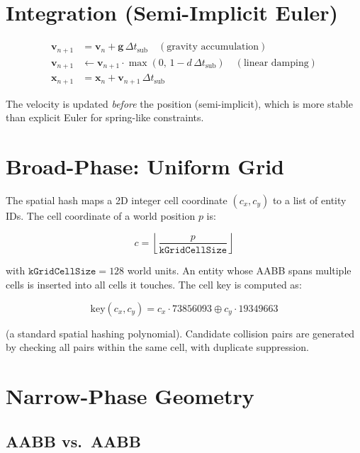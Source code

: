 \section{Integration (Semi-Implicit Euler)}

\begin{align}
  \mathbf{v}_{n+1} &= \mathbf{v}_n + \mathbf{g}\,\Delta t_\text{sub}
                    \quad (\text{gravity accumulation}) \\
  \mathbf{v}_{n+1} &\leftarrow \mathbf{v}_{n+1} \cdot \max(0,\, 1 - d\,\Delta t_\text{sub})
                    \quad (\text{linear damping}) \\
  \mathbf{x}_{n+1} &= \mathbf{x}_n + \mathbf{v}_{n+1}\,\Delta t_\text{sub}
\end{align}

The velocity is updated \emph{before} the position (semi-implicit),
which is more stable than explicit Euler for spring-like constraints.

\section{Broad-Phase: Uniform Grid}

The spatial hash maps a 2D integer cell coordinate $(c_x, c_y)$ to a
list of entity IDs. The cell coordinate of a world position $p$ is:

\begin{equation}
c = \left\lfloor \frac{p}{\texttt{kGridCellSize}} \right\rfloor
\end{equation}

with $\texttt{kGridCellSize} = 128$ world units. An entity whose AABB
spans multiple cells is inserted into all cells it touches. The cell key
is computed as:

\begin{equation}
\text{key}(c_x, c_y) = c_x \cdot 73856093 \oplus c_y \cdot 19349663
\end{equation}

(a standard spatial hashing polynomial). Candidate collision pairs are
generated by checking all pairs within the same cell, with duplicate
suppression.

\section{Narrow-Phase Geometry}

\subsection{AABB vs.\ AABB}

